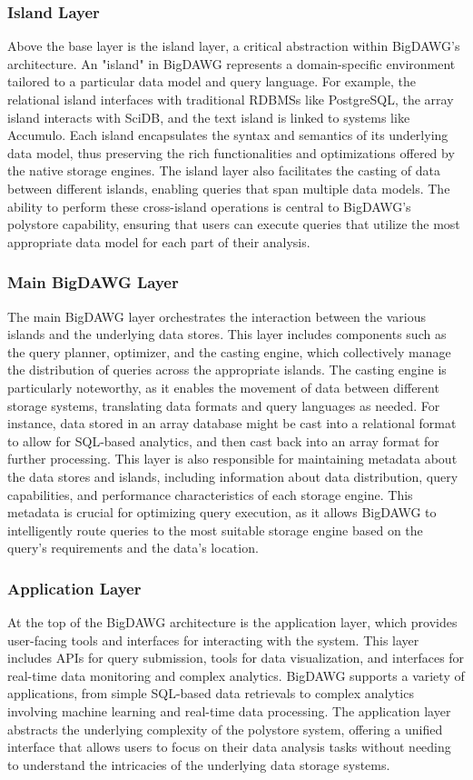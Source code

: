\subsubsection{Island Layer}
Above the base layer is the island layer, a critical abstraction within \ac{BigDAWG}'s architecture. An "island" in \ac{BigDAWG} represents a domain-specific environment tailored to a particular data model and query language. For example, the relational island interfaces with traditional RDBMSs like PostgreSQL, the array island interacts with SciDB, and the text island is linked to systems like Accumulo. Each island encapsulates the syntax and semantics of its underlying data model, thus preserving the rich functionalities and optimizations offered by the native storage engines. The island layer also facilitates the casting of data between different islands, enabling queries that span multiple data models. The ability to perform these cross-island operations is central to \ac{BigDAWG}’s polystore capability, ensuring that users can execute queries that utilize the most appropriate data model for each part of their analysis.
\subsubsection{Main BigDAWG Layer}
The main \ac{BigDAWG} layer orchestrates the interaction between the various islands and the underlying data stores. This layer includes components such as the query planner, optimizer, and the casting engine, which collectively manage the distribution of queries across the appropriate islands. The casting engine is particularly noteworthy, as it enables the movement of data between different storage systems, translating data formats and query languages as needed. For instance, data stored in an array database might be cast into a relational format to allow for SQL-based analytics, and then cast back into an array format for further processing.
This layer is also responsible for maintaining metadata about the data stores and islands, including information about data distribution, query capabilities, and performance characteristics of each storage engine. This metadata is crucial for optimizing query execution, as it allows \ac{BigDAWG} to intelligently route queries to the most suitable storage engine based on the query's requirements and the data's location.
\subsubsection{Application Layer}
At the top of the \ac{BigDAWG} architecture is the application layer, which provides user-facing tools and interfaces for interacting with the system. This layer includes APIs for query submission, tools for data visualization, and interfaces for real-time data monitoring and complex analytics. \ac{BigDAWG} supports a variety of applications, from simple SQL-based data retrievals to complex analytics involving machine learning and real-time data processing. The application layer abstracts the underlying complexity of the polystore system, offering a unified interface that allows users to focus on their data analysis tasks without needing to understand the intricacies of the underlying data storage systems.
